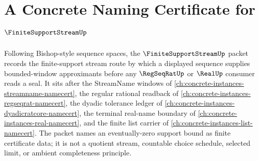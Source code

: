 \chapter{A Concrete Naming Certificate for $\FiniteSupportStreamUp$}
\label{ch:concrete-instances-finite-support-stream-namecert}

Following Bishop-style sequence spaces, the $\FiniteSupportStreamUp$ packet records the finite-support stream route by which a displayed sequence supplies bounded-window approximants before any $\RegSeqRatUp$ or $\RealUp$ consumer reads a seal. It sits after the StreamName windows of \autoref{ch:concrete-instances-streamname-namecert}, the regular rational readback of \autoref{ch:concrete-instances-regseqrat-namecert}, the dyadic tolerance ledger of \autoref{ch:concrete-instances-dyadicratcore-namecert}, the terminal real-name boundary of \autoref{ch:concrete-instances-real-namecert}, and the finite list carrier of \autoref{ch:concrete-instances-list-namecert}. The packet names an eventually-zero support bound as finite certificate data; it is not a quotient stream, countable choice schedule, selected limit, or ambient completeness principle.

